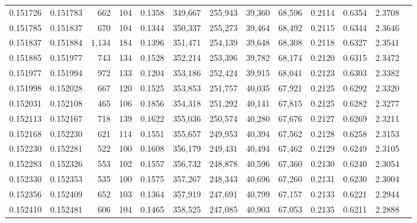 \begin{tabular}{rrrrrrrrrrrrr}
0.151726 & 0.151783 &   662 & 104 &                                     0.1358 & 349,667 & 255,943 &  39,360 &  68,596 & 0.2114 & 0.6354 & 2.3708 \\
0.151785 & 0.151837 &   670 & 104 &                                     0.1344 & 350,337 & 255,273 &  39,464 &  68,492 & 0.2115 & 0.6344 & 2.3646 \\
0.151837 & 0.151884 & 1,134 & 184 &                                     0.1396 & 351,471 & 254,139 &  39,648 &  68,308 & 0.2118 & 0.6327 & 2.3541 \\
0.151885 & 0.151977 &   743 & 134 &                                     0.1528 & 352,214 & 253,396 &  39,782 &  68,174 & 0.2120 & 0.6315 & 2.3472 \\
0.151977 & 0.151994 &   972 & 133 &                                     0.1204 & 353,186 & 252,424 &  39,915 &  68,041 & 0.2123 & 0.6303 & 2.3382 \\
0.151998 & 0.152028 &   667 & 120 &                                     0.1525 & 353,853 & 251,757 &  40,035 &  67,921 & 0.2125 & 0.6292 & 2.3320 \\
0.152031 & 0.152108 &   465 & 106 &                                     0.1856 & 354,318 & 251,292 &  40,141 &  67,815 & 0.2125 & 0.6282 & 2.3277 \\
0.152113 & 0.152167 &   718 & 139 &                                     0.1622 & 355,036 & 250,574 &  40,280 &  67,676 & 0.2127 & 0.6269 & 2.3211 \\
0.152168 & 0.152230 &   621 & 114 &                                     0.1551 & 355,657 & 249,953 &  40,394 &  67,562 & 0.2128 & 0.6258 & 2.3153 \\
0.152230 & 0.152281 &   522 & 100 &                                     0.1608 & 356,179 & 249,431 &  40,494 &  67,462 & 0.2129 & 0.6249 & 2.3105 \\
0.152283 & 0.152326 &   553 & 102 &                                     0.1557 & 356,732 & 248,878 &  40,596 &  67,360 & 0.2130 & 0.6240 & 2.3054 \\
0.152330 & 0.152353 &   535 & 100 &                                     0.1575 & 357,267 & 248,343 &  40,696 &  67,260 & 0.2131 & 0.6230 & 2.3004 \\
0.152356 & 0.152409 &   652 & 103 &                                     0.1364 & 357,919 & 247,691 &  40,799 &  67,157 & 0.2133 & 0.6221 & 2.2944 \\
0.152410 & 0.152481 &   606 & 104 &                                     0.1465 & 358,525 & 247,085 &  40,903 &  67,053 & 0.2135 & 0.6211 & 2.2888 \\

\end{tabular}
